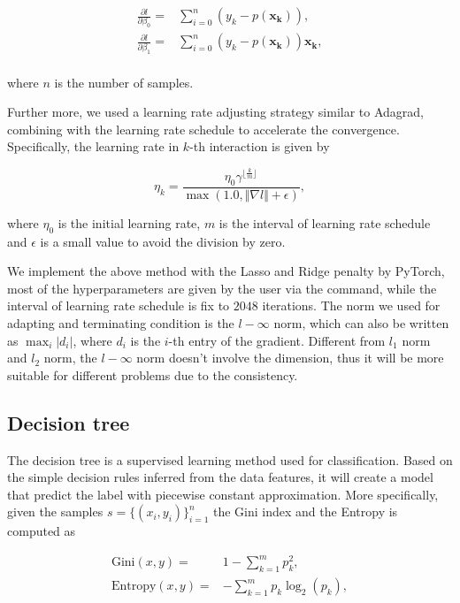 \documentclass[11pt]{article}
\begin{document}
$$
  \begin{aligned}
    \frac{\partial l}{\partial \beta_0} = & \sum_{i=0}^n (y_k - p (\mathbf{x_k})),              \\
    \frac{\partial l}{\partial \beta_1} = & \sum_{i=0}^n (y_k - p (\mathbf{x_k})) \mathbf{x_k}, \\
  \end{aligned}
$$

\noindent where $n$ is the number of samples.

Further more, we used a learning rate adjusting strategy similar to Adagrad, combining with the learning rate schedule to accelerate the convergence. Specifically, the learning rate in $k$-th interaction is given by

$$
  \eta_k = \frac{\eta_0 \gamma^{\lfloor \frac{k}{m} \rfloor}}{\max(1.0, \Vert \nabla l \Vert + \epsilon)},
$$

\noindent where $\eta_0$ is the initial learning rate, $m$ is the interval of learning rate schedule and $\epsilon$ is a small value to avoid the division by zero.

We implement the above method with the Lasso and Ridge penalty by PyTorch, most of the hyperparameters are given by the user via the command, while the interval of learning rate schedule is fix to $2048$ iterations. The norm we used for adapting and terminating condition is the $l-\infty$ norm, which can also be written as $\max_{i} \vert d_i \vert$, where $d_i$ is the $i$-th entry of the gradient. Different from $l_1$ norm and $l_2$ norm, the $l-\infty$ norm doesn't involve the dimension, thus it will be more suitable for different problems due to the consistency.

\subsection{Decision tree}

The decision tree is a supervised learning method used for classification. Based on the simple decision rules inferred from the data features, it will create a model that predict the label with piecewise constant approximation. More specifically, given the samples $s = \{(x_i, y_i)\}_{i=1}^n$ the Gini index and the Entropy is computed as

$$
  \begin{aligned}
    \text{Gini} (x, y) =    & 1 - \sum_{k=1}^m p_k^2,          \\
    \text{Entropy} (x, y) = & - \sum_{k=1}^m p_k \log_2 (p_k), \\
  \end{aligned}
$$
\end{document}
